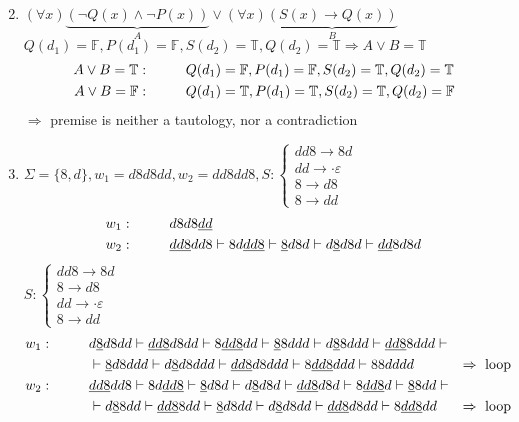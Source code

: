 \documentclass[a4paper,12pt, centered]{article}
\newcommand\tab[1][1cm]{\hspace*{#1}}
\begin{document}
\begin{enumerate}
\begin{multicols}{2}
\begin{enumerate}[(a)]
			\end{enumerate}
		\end{multicols}
	\item $(\forall x)\underbrace{(\neg Q(x)\land\neg P(x))}_{A}\lor(\forall x)\underbrace{(S(x)\to Q(x))}_{B}$\\
	$Q(d_1)=\mathbb{F},P(d_1)=\mathbb{F},S(d_2)=\mathbb{T},Q(d_2)=\mathbb{T}\Rightarrow A\lor B=\mathbb{T}$
	\begin{align*}
		A\lor B=\mathbb{T}:\tab&	Q(d_1)=\mathbb{F},P(d_1)=\mathbb{F},S(d_2)=\mathbb{T},Q(d_2)=\mathbb{T}\\
		A\lor B=\mathbb{F}:\tab&Q(d_1)=\mathbb{T},P(d_1)=\mathbb{T},S(d_2)=\mathbb{T},Q(d_2)=\mathbb{F}
	\end{align*}$\Rightarrow$ premise is neither a tautology, nor a contradiction
	\item $\Sigma=\{8,d\},w_1=d8d8dd,w_2=dd8dd8,S:\left\{\begin{array}{l}
		dd8\to8d\\dd\to\cdot\varepsilon\\8\to d8\\8\to dd
	\end{array} \right.$
		\begin{align*}
			w_1:\tab&d8d8\underline{dd}\\
			w_2:\tab&\underline{dd8}dd8\vdash 8d\underline{dd8}\vdash\underline{8}d8d\vdash d\underline{8}d8d\vdash\underline{dd}8d8d 
		\end{align*}
		$S:\left\{\begin{array}{l}
		dd8\to8d\\8\to d8\\dd\to\cdot\varepsilon\\8\to dd
	\end{array} \right.$
		\begin{align*}
			w_1:\tab&d\underline{8}d8dd\vdash\underline{dd8}d8dd\vdash8\underline{dd8}dd\vdash \underline{8}8ddd\vdash d\underline{8}8ddd\vdash\underline{dd8}8ddd\vdash\\&\vdash  \underline{8}d8ddd\vdash d\underline{8}d8ddd\vdash \underline{dd8}d8ddd\vdash 8\underline{dd8}ddd\vdash88dddd&\Rightarrow\textrm{ loop} \\ 
			w_2:\tab&\underline{dd8}dd8\vdash 8d\underline{dd8}\vdash\underline{8}d8d\vdash d\underline{8}d8d\vdash\underline{dd8}d8d\vdash8\underline{dd8}d\vdash\underline{8}8dd\vdash\\&\vdash d\underline{8}8dd\vdash \underline{dd8}8dd\vdash\underline{8}d8dd\vdash d\underline{8}d8dd\vdash \underline{dd8}d8dd\vdash 8\underline{dd8}dd&\Rightarrow\textrm{ loop} \\ 

\end{align*}
\end{enumerate}
\end{document}
